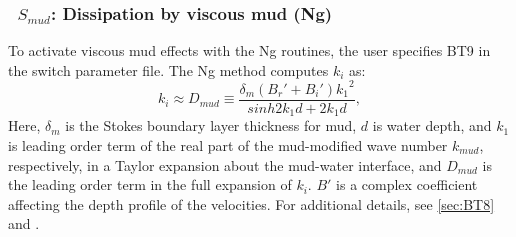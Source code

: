 \vsssub
\subsubsection{~$S_{mud}$: Dissipation by viscous mud (Ng)} \label{sec:BT9}
\vsssub


\noindent
To activate viscous mud effects with the Ng routines, the user specifies
{\code BT9} in the switch parameter file. The Ng method computes $k_i$ as:
\begin{equation}\label{eq:dmud3}
  k_i \approx {D_{mud}} \equiv \frac{\delta_m({B_r'}+{B_i'}){k_1}^2}{sinh2{k_1}{d}+2{k_1}{d}},
\end{equation}
Here, ${\delta_m}$ is the Stokes boundary layer thickness for mud, ${d}$ is
water depth, and ${k_1}$ is leading order term of the real part of the
mud-modified wave number $k_{mud}$, respectively, in a Taylor expansion about
the mud-water interface, and ${D_{mud}}$ is the leading order term in the full
expansion of $k_i$. $B'$ is a complex coefficient affecting the depth profile
of the velocities.  For additional details, see \para\ref{sec:BT8} and
\cite{art:Ng00}.
